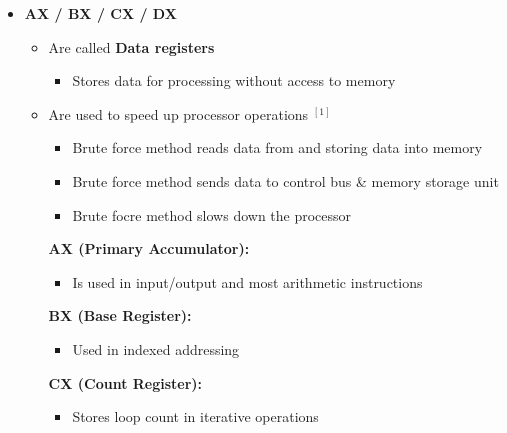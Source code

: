 \documentclass[12pt]{article}
\begin{document}
\begin{enumerate}[1.]
\begin{itemize}
\begin{itemize}
            \item \textbf{AX / BX / CX / DX}

            \begin{itemize}
                \item Are called \textbf{Data registers}
                \begin{itemize}
                    \item Stores data for processing without access to memory
                \end{itemize}
                \item Are used to speed up processor operations $^{[1]}$

                \begin{itemize}
                    \item Brute force method reads data from and storing data into memory
                    \item Brute force method sends data to control bus \& memory storage unit
                    \item Brute focre method slows down the processor
                \end{itemize}

                \bigskip

                \textbf{AX (Primary Accumulator):}

                \begin{itemize}
                    \item Is used in input/output and most arithmetic instructions
                \end{itemize}

                \bigskip

                \textbf{BX (Base Register):}

                \begin{itemize}
                    \item Used in indexed addressing
                \end{itemize}

                \bigskip

                \textbf{CX (Count Register):}

                \begin{itemize}
                    \item Stores loop count in iterative operations
                \end{itemize}

                \bigskip


\end{itemize}
\end{itemize}
\end{itemize}
\end{enumerate}
\end{document}
